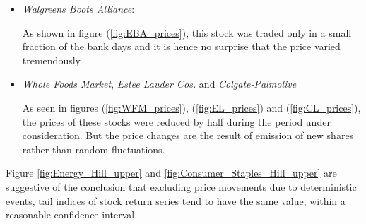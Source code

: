 \documentclass{article}
\begin{document}
\begin{itemize}
\item {\it Walgreens Boots Alliance}:

  As shown in figure (\ref{fig:EBA_prices}),
  this stock was traded only in a small fraction of the bank
  days and it is hence no surprise that the price varied
  tremendously.
\item {\it Whole Foods Market}, {\it Estee Lauder Cos.} and {\it
  Colgate-Palmolive}
  
  As seen in figures (\ref{fig:WFM_prices}), (\ref{fig:EL_prices}) and
  (\ref{fig:CL_prices}),
  the prices of these stocks were reduced by half during the
  period under consideration. But the price changes are the
  result of emission of new shares rather than random fluctuations.
\end{itemize}

Figure \ref{fig:Energy_Hill_upper} and
\ref{fig:Consumer_Staples_Hill_upper}
are suggestive of the conclusion that excluding price
movements due to deterministic events, tail indices of stock return
series tend to have the same value, within a reasonable confidence
interval.
\end{document}
